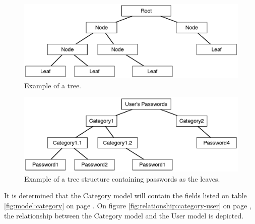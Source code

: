 			\begin{figure}[h!]
				\centering
				\includegraphics[width=\textwidth]{figures/design/general/generic-tree.eps}
				\caption{Example of a tree.}
				\label{fig:example:tree}
			\end{figure}
		
			\begin{figure}[p]
				\centering
				\includegraphics[width=\textwidth]{figures/design/general/password-tree.eps}
				\caption{Example of a tree structure containing passwords as the leaves.}
				\label{fig:example:passwordtree}
			\end{figure}

			It is determined that the Category model will contain the fields listed on table \ref{fig:model:category} on page \pageref{fig:model:category}. On figure \ref{fig:relationship:category-user} on page \pageref{fig:relationship:category-user}, the relationship between the Category model and the User model is depicted.


